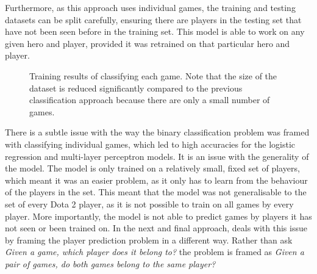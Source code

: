 \documentclass[Report.tex]{subfiles}
\begin{document}
Furthermore, as this approach uses individual games, the training and testing datasets can be split carefully, ensuring there are players in the testing set that have not been seen before in the training set. This model is able to work on any given hero and player, provided it was retrained on that particular hero and player. 

\begin{figure}[H]
\centering
{}
\caption{Training results of classifying each game. Note that the size of the dataset is reduced significantly compared to the previous classification approach because there are only a small number of games.}
\end{figure}



There is a subtle issue with the way the binary classification problem was framed with classifying individual games, which led to high accuracies for the logistic regression and multi-layer perceptron models. It is an issue with the generality of the model. The model is only trained on a relatively small, fixed set of players, which meant it was an easier problem, as it only has to learn from the behaviour of the players in the set. This meant that the model was not generalisable to the set of every Dota 2 player, as it is not possible to train on all games by every player. More importantly, the model is not able to predict games by players it has not seen or been trained on. In the next and final approach, deals with this issue by framing the player prediction problem in a different way. Rather than ask \textit{Given a game, which player does it belong to?} the problem is framed as \textit{Given a pair of games, do both games belong to the same player?}
\end{document}
